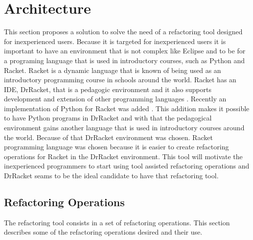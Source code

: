 
% 
% 

\section{Architecture}

This section proposes a solution to solve the need of a refactoring tool designed for inexperienced users.
Because it is targeted for inexperienced users it is important to have an environment that is not complex like Eclipse and to be for a programing language that is used in introductory courses, such as Python and Racket.
Racket is a dynamic language that is known of being used as an introductory programming course in schools around the world. 
Racket has an IDE, DrRacket, that is a pedagogic environment \cite{drscheme_pegadogy} and it also supports development and extension of other programming languages \cite{tobin2011languages}. 
Recently  an implementation of Python for Racket was added \cite{ramos2014implementation}. 
This addition makes it possible to have Python programs in DrRacket and with that the pedagogical environment gains another language that is used in introductory courses around the world. Because of that DrRacket environment was chosen. 
Racket programming language was chosen because it is easier to create refactoring operations for Racket in the DrRacket environment.
This tool will motivate the inexperienced programmers to start using tool assisted refactoring operations and DrRacket seams to be the ideal candidate to have that refactoring tool.


\subsection{Refactoring Operations}
The refactoring tool consists in a set of refactoring operations.
This section describes some of the refactoring operations desired and their use.

